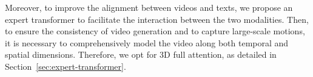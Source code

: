 Moreover, to improve the alignment between videos and texts, we propose an expert transformer to facilitate the interaction between the two modalities. Then, to ensure the consistency of video generation and to capture large-scale motions, it is necessary to comprehensively model the video along both temporal and spatial dimensions. Therefore, we opt for 3D full attention, as detailed in Section~\ref{sec:expert-transformer}.



